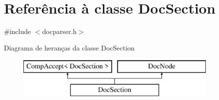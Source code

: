 \hypertarget{class_doc_section}{\section{Referência à classe Doc\-Section}
\label{class_doc_section}
}


{\ttfamily \#include $<$docparser.\-h$>$}

Diagrama de heranças da classe Doc\-Section\begin{figure}[H]
\begin{center}
\leavevmode
\includegraphics[height=2.000000cm]{class_doc_section}
\end{center}
\end{figure}
